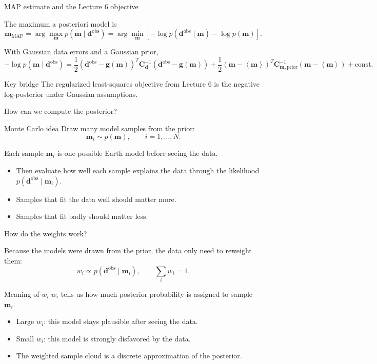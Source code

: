 \documentclass[aspectratio=169]{beamer}
\newcommand{\mat}[1]{{\mathbf{#1}}}
\renewcommand{\vec}[1]{\mathbf{#1}}
\newcommand{\dd}{ {\vec{d}} }
\newcommand{\dobs}{{\vec{d}^{\text{obs}}}}
\newcommand{\mm}{ {\vec{m}} }
\newcommand{\mmean}{\left\langle \mm \right\rangle}
\renewcommand{\gg}[1]{\vec{g}\left(#1\right)}
\newcommand{\Cd}{\mat{C}_{\dd}}
\newcommand{\Cm}{\mat{C}_{\mm,\text{prior}}}
\begin{document}
\begin{frame}{MAP estimate and the Lecture 6 objective}
\small

The maximum a posteriori model is
\[
\mm_{\mathrm{MAP}}
=
\arg\max_{\mm}p(\mm\mid\dobs)
=
\arg\min_{\mm}\left[-\log p(\dobs\mid\mm)-\log p(\mm)\right].
\]

With Gaussian data errors and a Gaussian prior,
\[
-\log p(\mm\mid\dobs)
=
\frac{1}{2}
\left(\dobs-\gg{\mm}\right)^T\Cd^{-1}
\left(\dobs-\gg{\mm}\right)
+
\frac{1}{2}
(\mm-\mmean)^T\Cm^{-1}(\mm-\mmean)
+\text{const}.
\]

\begin{alertblock}{Key bridge}
The regularized least-squares objective from Lecture 6 is the negative log-posterior under Gaussian assumptions.
\end{alertblock}
\end{frame}

\begin{frame}{How can we compute the posterior?}
\small

\begin{block}{Monte Carlo idea}
Draw many model samples from the prior:
\[
\mm_i\sim p(\mm),
\qquad i=1,\dots,N.
\]

Each sample $\mm_i$ is one possible Earth model before seeing the data.
\end{block}

\begin{itemize}
    \item[--] Then evaluate how well each sample explains the data through the likelihood $p(\dobs\mid\mm_i)$.
    \item[--] Samples that fit the data well should matter more.
    \item[--] Samples that fit badly should matter less.
\end{itemize}
\end{frame}

\begin{frame}{How do the weights work?}
\small

Because the models were drawn from the prior, the data only need to reweight them:
\[
w_i\propto p(\dobs\mid\mm_i),
\qquad \sum_i w_i=1.
\]

\begin{alertblock}{Meaning of $w_i$}
$w_i$ tells us how much posterior probability is assigned to sample $\mm_i$.
\end{alertblock}

\begin{itemize}
    \item[--] Large $w_i$: this model stays plausible after seeing the data.
    \item[--] Small $w_i$: this model is strongly disfavored by the data.
    \item[--] The weighted sample cloud is a discrete approximation of the posterior.
\end{itemize}
\end{frame}
\end{document}
